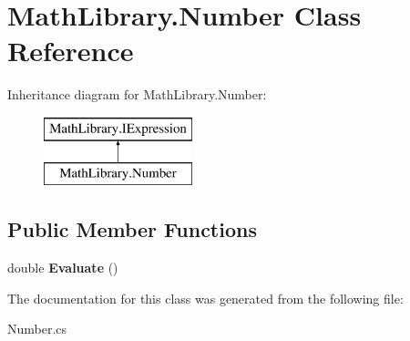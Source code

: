 \hypertarget{class_math_library_1_1_number}{}\section{Math\+Library.\+Number Class Reference}
\label{class_math_library_1_1_number}
Inheritance diagram for Math\+Library.\+Number\+:\begin{figure}[H]
\begin{center}
\leavevmode
\includegraphics[height=2.000000cm]{class_math_library_1_1_number}
\end{center}
\end{figure}
\subsection*{Public Member Functions}
\begin{DoxyCompactItemize}
\item 
\mbox{\label{class_math_library_1_1_number_a6294f47064ee64c4bec92316fdd0880f}} 
double {\bfseries Evaluate} ()
\end{DoxyCompactItemize}


The documentation for this class was generated from the following file\+:\begin{DoxyCompactItemize}
\item 
Number.\+cs\end{DoxyCompactItemize}
